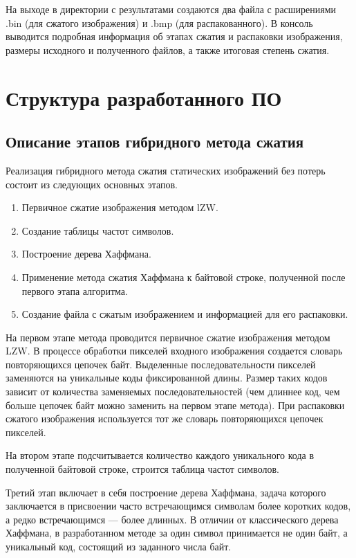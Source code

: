 На выходе в директории с результатами создаются два файла с расширениями .bin (для сжатого изображения) и .bmp (для распакованного). В консоль выводится подробная информация об этапах сжатия и распаковки изображения, размеры исходного и полученного файлов, а также итоговая степень сжатия.

\section{Структура разработанного ПО}

\subsection{Описание этапов гибридного метода сжатия}

Реализация гибридного метода сжатия статических изображений без потерь состоит из следующих основных этапов.
\begin{enumerate}
    \item Первичное сжатие изображения методом lZW.
    \item Создание таблицы частот символов.
    \item Построение дерева Хаффмана.
    \item Применение метода сжатия Хаффмана к байтовой строке, полученной после первого этапа алгоритма.
    \item Создание файла с сжатым изображением и информацией для его распаковки.
\end{enumerate}

На первом этапе метода проводится первичное сжатие изображения методом LZW. В процессе обработки пикселей входного изображения создается словарь повторяющихся цепочек байт. Выделенные последовательности пикселей заменяются на уникальные коды фиксированной длины. Размер таких кодов зависит от количества заменяемых последовательностей (чем длиннее код, чем больше цепочек байт можно заменить на первом этапе метода). При распаковки сжатого изображения используется тот же словарь повторяющихся цепочек пикселей.

На втором этапе подсчитывается количество каждого уникального кода в полученной байтовой строке, строится таблица частот символов.

Третий этап включает в себя построение дерева Хаффмана, задача которого заключается в присвоении часто встречающимся символам более коротких кодов, а редко встречающимся --- более длинных. В отличии от классического дерева Хаффмана, в разработанном методе за один символ принимается не один байт, а уникальный код, состоящий из заданного числа байт.

